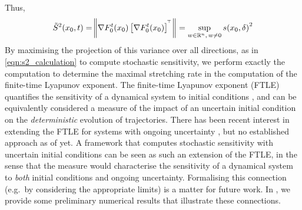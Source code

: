 Thus,
\[
	\tilde{S}^2\!\left(x_0, t\right) = \norm{\nabla F_0^t\!\left(x_0\right)\left[\nabla F_0^t\!\left(x_0\right)\right]^{^{\!\top}}} = \sup_{w \in \mathbb{R}^n, \, w \neq 0}{s\!\left(x_0, \delta\right)^2}
\]
By maximising the projection of this variance over all directions, as in \cref{eqn:s2_calculation} to compute stochastic sensitivity, we perform exactly the computation to determine the maximal stretching rate in the computation of the finite-time Lyapunov exponent.
The finite-time Lyapunov exponent (FTLE) quantifies the sensitivity of a dynamical system to initial conditions \citep{ShaddenEtAl_2005_DefinitionPropertiesLagrangian}, and can be equivalently considered a measure of the impact of an uncertain initial condition on the \emph{deterministic} evolution of trajectories.
There has been recent interest in extending the FTLE for systems with ongoing uncertainty \citep{Balasuriya_2020_UncertaintyFinitetimeLyapunov,YouLeung_2021_ComputingFiniteTime,GuoEtAl_2016_FiniteTimeLyapunovExponents}, but no established approach as of yet.
A framework that computes stochastic sensitivity with uncertain initial conditions can be seen as such an extension of the FTLE, in the sense that the measure would characterise the sensitivity of a dynamical system to \emph{both} initial conditions and ongoing uncertainty.
Formalising this connection (e.g.\ by considering the appropriate limits) is a matter for future work.
In , we provide some preliminary numerical results that illustrate these connections.

